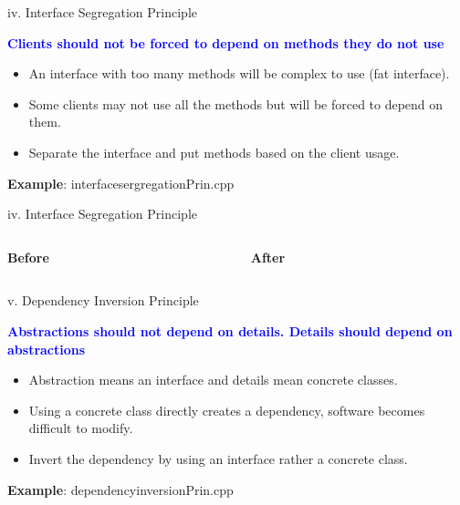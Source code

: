 \documentclass[13pt]{beamer}
\begin{document}
\begin{frame}{iv. Interface Segregation Principle}
	\begin{center}
		\textcolor{blue}{\textbf{Clients should not be forced to depend on methods they do not 			use}}
	\end{center}
	
	\begin{itemize}
		\setlength\itemsep{1em}
		\item An interface with too many methods will be complex to use (fat interface).
		\item Some clients may not use all the methods but will be forced to depend on them.
		\item Separate the interface and put methods based on the client usage.
	\end{itemize}
	\textbf{Example}: interfacesergregationPrin.cpp
\end{frame}

\begin{frame}{iv. Interface Segregation Principle}
\begin{columns}[T]
\begin{column}{.48\textwidth}
\textbf{Before}

\end{column}
\begin{column}{.48\textwidth}
\textbf{After}

\end{column}
\end{columns}
\end{frame}

\begin{frame}{v. Dependency Inversion Principle}
	\begin{center}
		\textcolor{blue}{\textbf{Abstractions should not depend on details. Details should depend on abstractions}}
	\end{center}
	
	\begin{itemize}
		\setlength\itemsep{1em}
		\item Abstraction means an interface and details mean concrete classes.
		\item Using a concrete class directly creates a dependency, software becomes difficult 			to modify.
		\item Invert the dependency by using an interface rather a concrete class.
	\end{itemize}
	\textbf{Example}: dependencyinversionPrin.cpp
\end{frame}
\end{document}
